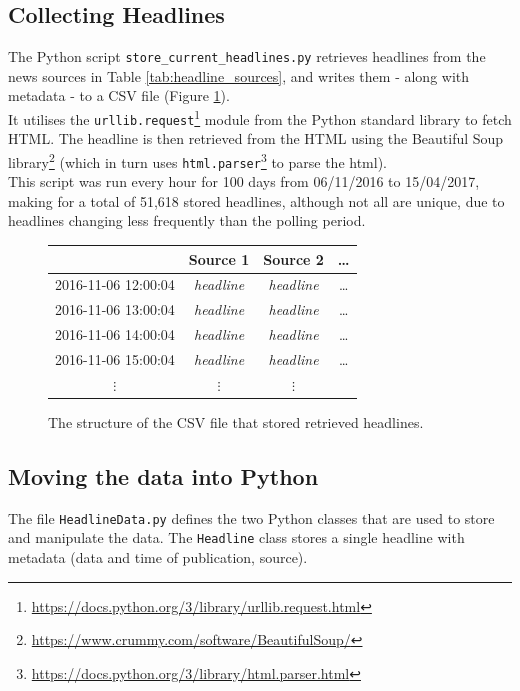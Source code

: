 \documentclass[a4paper,12pt]{article}
\begin{document}
\subsection{Collecting Headlines}
The Python script \texttt{store\_current\_headlines.py} retrieves headlines from the news sources in Table \ref{tab:headline_sources}, and writes them - along with metadata - to a CSV file (Figure \ref{fig:csv}). \\
It utilises the \texttt{urllib.request}\footnote{\url{https://docs.python.org/3/library/urllib.request.html}} module from the Python standard library to fetch HTML. The headline is then retrieved from the HTML using the Beautiful Soup library\footnote{\url{https://www.crummy.com/software/BeautifulSoup/}} (which in turn uses \texttt{html.parser}\footnote{\url{https://docs.python.org/3/library/html.parser.html}} to parse the html). \\
This script was run every hour for 100 days from 06/11/2016 to 15/04/2017, making for a total of 51,618 stored headlines, although not all are unique, due to headlines changing less frequently than the polling period.

\begin{figure}[H]
    \centering
    {\small
    \begin{tabular}{|c|c|c|c}
        \hline
                            &Source 1          &Source 2         &\ldots \\
        \hline
        2016-11-06 12:00:04&\textit{headline} &\textit{headline}&\ldots \\
        \hline
        2016-11-06 13:00:04&\textit{headline} &\textit{headline}&\ldots \\
        \hline
        2016-11-06 14:00:04&\textit{headline} &\textit{headline}&\ldots \\
        \hline
        2016-11-06 15:00:04&\textit{headline} &\textit{headline}&\ldots \\
        \hline
        $\vdots$&$\vdots$&$\vdots$& \\
    \end{tabular}
    }
    \caption{The structure of the CSV file that stored retrieved headlines.}
    \label{fig:csv}
\end{figure}

\subsection{Moving the data into Python}
The file \texttt{HeadlineData.py} defines the two Python classes that are used to store and manipulate the data. The \texttt{Headline} class stores a single headline with metadata (data and time of publication, source).
\end{document}
